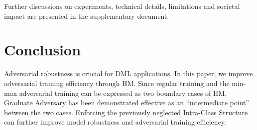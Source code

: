 \documentclass[10pt,twocolumn,letterpaper]{article}
\begin{document}
Further discussions on experiments, technical details, limitations and societal
impact are presented in the supplementary document.


\section{Conclusion}
\label{sec:5}

Adversarial robustness is crucial for DML applications.
%
In this paper, we improve adversarial training efficiency through HM.
%
Since regular training and the min-max adversarial training can be expressed as
two boundary cases of HM, Graduate Adversary has been demonstrated effective as
an ``intermediate point'' between the two cases.
%
Enforcing the previously neglected Intra-Class Structure can further improve
model robustness and adversarial training efficiency.
%

{\small


}


\end{document}
